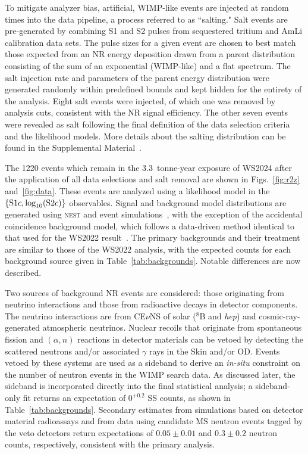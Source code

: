 \documentclass[%
 reprint,
 superscriptaddress,
 amsmath,amssymb,
 prl,
floatfix,
]{revtex4-2}
\newcommand{\RevA}[1]{{\color{black}#1}}
\begin{document}
To mitigate analyzer bias, artificial, WIMP-like events are injected at random times into the data pipeline, a process referred to as ``salting." Salt events are pre-generated by combining S1 and S2 pulses from sequestered tritium and AmLi calibration data sets. The pulse sizes for a given event are chosen to best match those expected from an NR energy deposition drawn from a parent distribution consisting of the sum of an exponential (WIMP-like) and a flat spectrum. The salt injection rate and parameters of the parent energy distribution were generated randomly within predefined bounds and kept hidden for the entirety of the analysis. Eight salt events were injected, of which one was removed by analysis cuts, consistent with the NR signal efficiency. The other seven events were revealed as salt following the final definition of the data selection criteria and the likelihood models. \RevA{More details about the salting distribution can be found in the Supplemental Material~\cite{Supplemental}.}

The 1220 events which remain in the 3.3~tonne-year exposure of WS2024 after the application of all data selections and salt removal are shown in Figs.~\ref{fig:r2z} and~\ref{fig:data}. These events are analyzed using a likelihood model in the $\{{\rm S1}c, \text{log}_{10}({\rm S2}c) \}$ observables. Signal and background model distributions are generated using \textsc{nest} and event simulations~\cite{LZSims}, with the exception of the accidental coincidence background model, which follows a data-driven method identical to that used for the WS2022 result~\cite{LZ-backgrounds}. The primary backgrounds and their treatment are similar to those of the WS2022 analysis, with the expected counts for each background source given in Table~\ref{tab:backgrounds}. Notable differences are now described. 

Two sources of background NR events are considered: those originating from neutrino interactions and those from radioactive decays in detector components. The neutrino interactions are from CE$\nu$NS of solar ($^{8}$B and \textit{hep}) and cosmic-ray-generated atmospheric neutrinos. Nuclear recoils that originate from spontaneous fission and $(\alpha, n)$ reactions in detector materials can be vetoed by detecting the scattered neutrons and/or associated $\gamma$ rays in the Skin and/or OD. Events vetoed by these systems are used as a sideband to derive an \textit{in-situ} constraint on the number of neutron events in the WIMP search data. As discussed later, the sideband is incorporated directly into the final statistical analysis; a sideband-only fit returns an expectation of $0^{+0.2}$ SS counts, as shown in Table~\ref{tab:backgrounds}. Secondary estimates from simulations based on detector material radioassays and from data using candidate MS neutron events tagged by the veto detectors return expectations of $0.05 \pm 0.01$ and $0.3\pm0.2$ neutron counts, respectively, consistent with the primary analysis.
\end{document}
